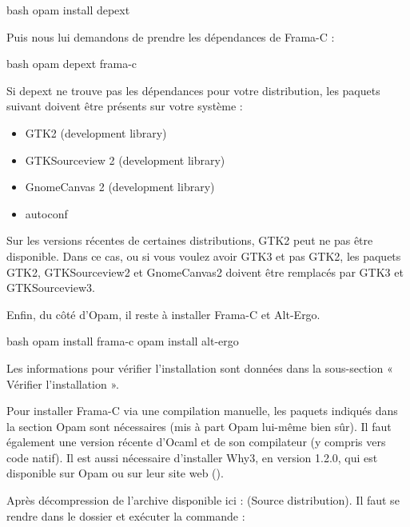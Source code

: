 \begin{CodeBlock}{bash}
opam install depext
\end{CodeBlock}


Puis nous lui demandons de prendre les dépendances de Frama-C :


\begin{CodeBlock}{bash}
opam depext frama-c
\end{CodeBlock}


Si depext ne trouve pas les dépendances pour votre distribution, les paquets
suivant doivent être présents sur votre système :


\begin{itemize}
\item GTK2 (development library)
\item GTKSourceview 2 (development library)
\item GnomeCanvas 2 (development library)
\item autoconf
\end{itemize}

Sur les versions récentes de certaines distributions, GTK2 peut ne pas
être disponible. Dans ce cas, ou si vous voulez avoir GTK3 et pas GTK2,
les paquets GTK2, GTKSourceview2 et GnomeCanvas2 doivent être remplacés
par GTK3 et GTKSourceview3.


Enfin, du côté d'Opam, il reste à installer Frama-C et Alt-Ergo.



\begin{CodeBlock}{bash}
opam install frama-c
opam install alt-ergo
\end{CodeBlock}


Les informations pour vérifier l'installation sont données dans la sous-section « Vérifier l'installation ».





Pour installer Frama-C via une compilation manuelle, les paquets indiqués dans la
section Opam sont nécessaires (mis à part Opam lui-même bien sûr). Il faut
également une version récente d'Ocaml et de son compilateur (y compris vers
code natif). Il est aussi nécessaire d'installer Why3, en version 1.2.0,
qui est disponible sur Opam ou sur leur site web
().



Après décompression de l'archive disponible ici :
 (Source distribution).
Il faut se rendre dans le dossier et exécuter la commande :



